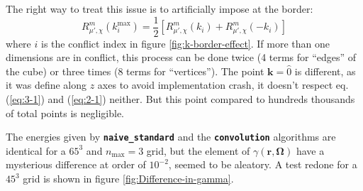 The right way to treat this issue is to artificially impose at the
border:
\begin{equation}
R_{\mu',\chi}^{m}(k_{i}^{\mathrm{max}})=\frac{1}{2}\left[R_{\mu',\chi}^{m}(k_{i})+R_{\mu',\chi}^{m}(-k_{i})\right]
\end{equation}
where $i$ is the conflict index in figure \ref{fig:k-border-effect}.
If more than one dimensions are in conflict, this process can be done
twice (4 terms for ``edges'' of the cube) or three times (8 terms
for ``vertices''). The point $\mathbf{k}=\hat{0}$ is different,
as it was define along $z$ axes to avoid implementation crash, it
doesn't respect eq. (\ref{eq:3-1}) and (\ref{eq:2-1}) neither. But
this point compared to hundreds thousands of total points is negligible.

The energies given by \texttt{\textbf{naive\_standard}} and the \texttt{\textbf{convolution}}
algorithms are identical for a $65^{3}$ and $n_{\max}=3$ grid, but
the element of $\gamma(\mathbf{r},\mathbf{\Omega})$ have a mysterious
difference at order of $10^{-2}$, seemed to be aleatory. A test redone
for a $45^{3}$ grid is shown in figure \ref{fig:Difference-in-gamma}.


